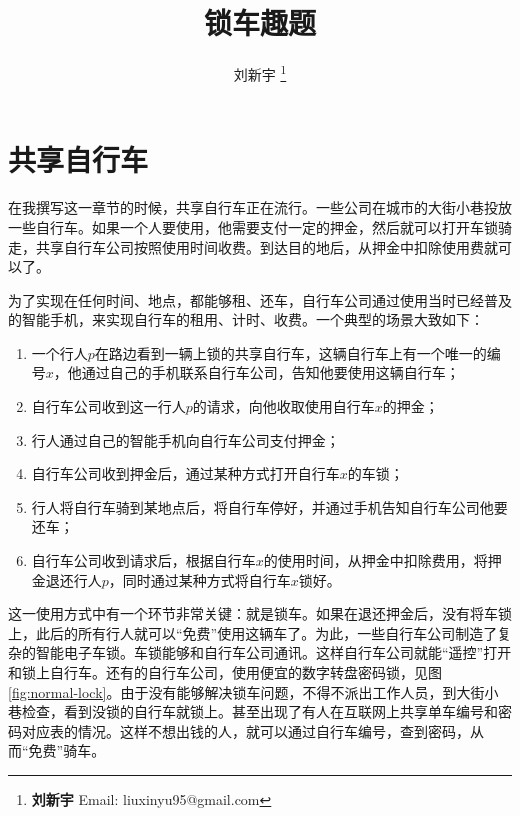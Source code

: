 \documentclass[UTF8]{article}
\begin{document}

\title{锁车趣题}

\author{刘新宇
\thanks{{\bfseries 刘新宇} \newline
  Email: liuxinyu95@gmail.com \newline}
  }

\maketitle
\fi


\section{共享自行车}

在我撰写这一章节的时候，共享自行车正在流行。一些公司在城市的大街小巷投放一些自行车。如果一个人要使用，他需要支付一定的押金，然后就可以打开车锁骑走，共享自行车公司按照使用时间收费。到达目的地后，从押金中扣除使用费就可以了。

为了实现在任何时间、地点，都能够租、还车，自行车公司通过使用当时已经普及的智能手机，来实现自行车的租用、计时、收费。一个典型的场景大致如下：

\begin{enumerate}
\item 一个行人$p$在路边看到一辆上锁的共享自行车，这辆自行车上有一个唯一的编号$x$，他通过自己的手机联系自行车公司，告知他要使用这辆自行车；
\item 自行车公司收到这一行人$p$的请求，向他收取使用自行车$x$的押金；
\item 行人通过自己的智能手机向自行车公司支付押金；
\item 自行车公司收到押金后，通过某种方式打开自行车$x$的车锁；
\item 行人将自行车骑到某地点后，将自行车停好，并通过手机告知自行车公司他要还车；
\item 自行车公司收到请求后，根据自行车$x$的使用时间，从押金中扣除费用，将押金退还行人$p$，同时通过某种方式将自行车$x$锁好。
\end{enumerate}

这一使用方式中有一个环节非常关键：就是锁车。如果在退还押金后，没有将车锁上，此后的所有行人就可以“免费”使用这辆车了。为此，一些自行车公司制造了复杂的智能电子车锁。车锁能够和自行车公司通讯。这样自行车公司就能“遥控”打开和锁上自行车。还有的自行车公司，使用便宜的数字转盘密码锁，见图\ref{fig:normal-lock}。由于没有能够解决锁车问题，不得不派出工作人员，到大街小巷检查，看到没锁的自行车就锁上。甚至出现了有人在互联网上共享单车编号和密码对应表的情况。这样不想出钱的人，就可以通过自行车编号，查到密码，从而“免费”骑车。
\end{document}
